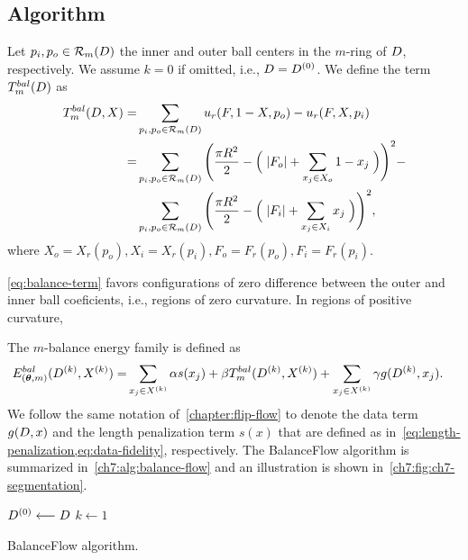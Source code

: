 \subsection{Algorithm}

Let $p_i, p_o \in \mathcal{R}_m(D)$ the inner and outer ball centers in the $m$-ring of $D$, respectively. We assume $k=0$ if omitted, i.e., $D=D^{(0)}$. We define the term $T_{m}^{bal}(D)$ as
\begin{align}
	\footnotesize
	T_{m}^{bal}(D,X) =& \sum_{p_i,p_o \in \mathcal{R}_m(D)}{u_r(F,1-X,p_o) - u_r(F,X,p_i)} \nonumber \\
	=&  \sum_{p_i,p_o \in \mathcal{R}_m(D)}{\Bigg( \frac{\pi R^2}{2} - \Big(\; |F_o| + \sum_{ x_j \in X_o}{1-x_j} \; \Big) \Bigg)^2} - \nonumber \\
	& \sum_{p_i,p_o \in \mathcal{R}_m(D)}{
	\Bigg(\frac{\pi R^2}{2} - \Big(\; |F_i| + \sum_{x_j \in X_i}{x_j}\;\Big)\Bigg)^2},
	\label{eq:balance-term}
\end{align}
%
where $X_o=X_r(p_o), X_i=X_r(p_i), F_o=F_r(p_o), F_i=F_r(p_i)$.


\cref{eq:balance-term} favors configurations of zero difference between the outer and inner ball coeficients, i.e., regions of zero curvature. In regions of positive curvature, 

The $m$-balance energy family is defined as
\begin{align}
  E_{(\bm{\theta},m)}^{bal}(D^{(k)},X^{(k)}) =& \sum_{x_j \in X^{(k)}}{\alpha s(x_j)} + \beta T_{m}^{bal}(D^{(k)},X^{(k)}) + \sum_{x_j \in X^{(k)}}{\gamma g(D^{(k)},x_j)}.
  \label{eq:single-step-energy-family}
\end{align}
%
We follow the same notation of~\cref{chapter:flip-flow} to denote the data term $g(D,x)$ and the length penalization term $s(x)$ that are defined as in~\cref{eq:length-penalization,eq:data-fidelity}, respectively. The BalanceFlow algorithm is summarized in~\cref{ch7:alg:balance-flow} and an illustration is shown in~\cref{ch7:fig:ch7-segmentation}.

\begin{algorithm}
 
 \BlankLine
 $D^{(0)} \longleftarrow D$\;
 $k \longleftarrow 1$\;
 \caption{BalanceFlow algorithm.}
 \label{ch7:alg:balance-flow}  
\end{algorithm}

